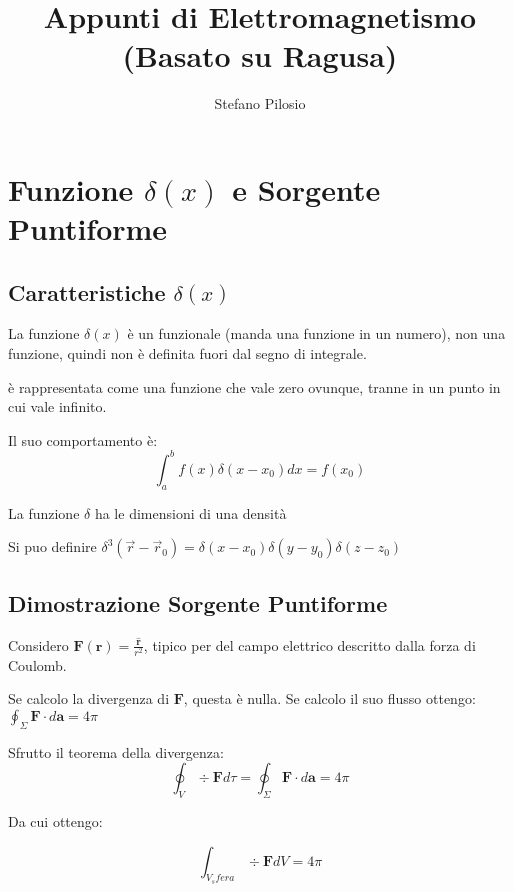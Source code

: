 \documentclass[a4paper]{scrarticle}
\begin{document}
\title{Appunti di Elettromagnetismo (Basato su Ragusa)}
\author{Stefano Pilosio}

\maketitle

\section{Funzione $\delta(x)$ e Sorgente Puntiforme}

\subsection{Caratteristiche $\delta(x)$}

La funzione $\delta(x)$ è un funzionale (manda una funzione in un numero), non una funzione, quindi non è definita fuori dal segno di integrale.

è rappresentata come una funzione che vale zero ovunque, tranne in un punto in cui vale infinito.

Il suo comportamento è:
\begin{equation*}
    \int_{a}^{b} f(x) \delta (x-x_0) dx = f(x_0)
\end{equation*}

La funzione $\delta$ ha le dimensioni di una densità

Si puo definire $\delta^3(\vec r - \vec r_0) = \delta(x-x_0)\delta(y-y_0)\delta(z-z_0)$

\subsection{Dimostrazione Sorgente Puntiforme}

Considero $\bm {F} (\bm r) = \frac{\hat {\bm{r}}}{r^2}$, tipico per del campo elettrico descritto dalla forza di Coulomb.

Se calcolo la divergenza di $\bm F$, questa è nulla.
Se calcolo il suo flusso ottengo: $\oint_{\Sigma} \bm {F} \cdot d \bm{a} = 4\pi$

Sfrutto il teorema della divergenza:
\begin{equation*}
    \oint_{V} \div{\bm{F}} d\tau = \oint_{\Sigma} \bm{F} \cdot d \bm{a} = 4\pi
\end{equation*}

Da cui ottengo:

\begin{equation*}
    \int_{V_sfera} \div {\bm F} dV = 4\pi
\end{equation*}
\end{document}
